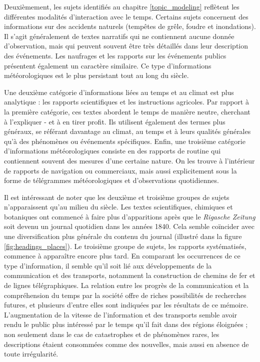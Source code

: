 \documentclass[a4paper,twoside,12pt]{article}
\begin{document}
Deuxièmement, les sujets identifiés au chapitre \ref{topic_modeling} reflètent les différentes modalités d'interaction avec le temps. Certains sujets concernent des informations sur des accidents naturels (tempêtes de grêle, foudre et inondations). Il s'agit généralement de textes narratifs qui ne contiennent aucune donnée d'observation, mais qui peuvent souvent être très détaillés dans leur description des événements. Les naufrages et les rapports sur les événements publics présentent également un caractère similaire. Ce type d'informations météorologiques est le plus persistant tout au long du siècle.

Une deuxième catégorie d'informations liées au temps et au climat est plus analytique : les rapports scientifiques et les instructions agricoles. Par rapport à la première catégorie, ces textes abordent le temps de manière neutre, cherchant à l'expliquer - et à en tirer profit. Ils utilisent également des termes plus généraux, se référant davantage au climat, au temps et à leurs qualités générales qu'à des phénomènes ou événements spécifiques. Enfin, une troisième catégorie d'informations météorologiques consiste en des rapports de routine qui contiennent souvent des mesures d'une certaine nature. On les trouve à l'intérieur de rapports de navigation ou commerciaux, mais aussi explicitement sous la forme de télégrammes météorologiques et d'observations quotidiennes.

Il est intéressant de noter que les deuxième et troisième groupes de sujets n'apparaissent qu'au milieu du siècle. Les textes scientifiques, chimiques et botaniques ont commencé à faire plus d'apparitions après que le \textit{Rigasche Zeitung} soit devenu un journal quotidien dans les années 1840. Cela semble coïncider avec une diversification plus générale du contenu du journal (illustré dans la figure \ref{fig:headings_places}). Le troisième groupe de sujets, les rapports systématisés, commence à apparaître encore plus tard. En comparant les occurrences de ce type d'information, il semble qu'il soit lié aux développements de la communication et des transports, notamment la construction de chemins de fer et de lignes télégraphiques. La relation entre les progrès de la communication et la compréhension du temps par la société offre de riches possibilités de recherches futures, et plusieurs d'entre elles sont indiquées par les résultats de ce mémoire. L'augmentation de la vitesse de l'information et des transports semble avoir rendu le public plus intéressé par le temps qu'il fait dans des régions éloignées ; non seulement dans le cas de catastrophes et de phénomènes rares, les descriptions étaient consommées comme des nouvelles, mais aussi en absence de toute irrégularité.
\end{document}
